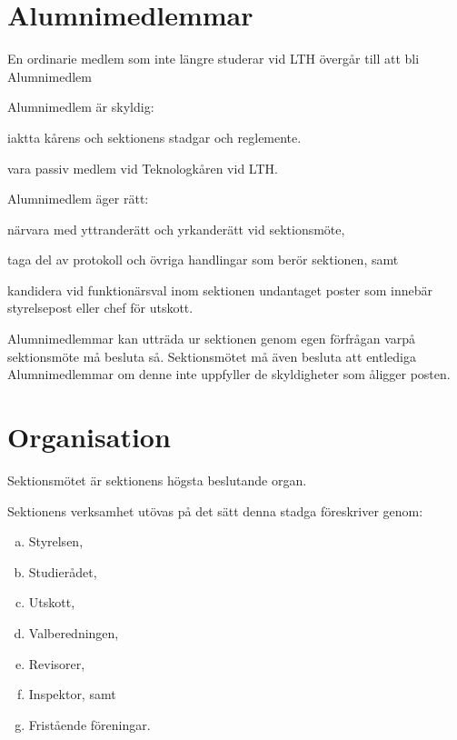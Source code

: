 \documentclass[stadgar]{dsekprotokoll}
\begin{document}
\section{Alumnimedlemmar}

\begin{stadgeavsnitt}

	En ordinarie medlem som inte längre
	studerar vid LTH övergår till att bli Alumnimedlem


Alumnimedlem är skyldig:
\begin{attlista}
	\item iaktta kårens och sektionens stadgar och reglemente.
	\item vara passiv medlem vid Teknologkåren vid LTH.
\end{attlista}


Alumnimedlem äger rätt:
\begin{attlista}
\item närvara med yttranderätt och yrkanderätt vid sektionsmöte,
\item taga del av protokoll och övriga handlingar som berör sektionen, samt
\item kandidera vid funktionärsval inom sektionen undantaget poster som
  innebär styrelsepost eller chef för utskott.
\end{attlista}

 Alumnimedlemmar kan utträda ur sektionen genom egen förfrågan varpå sektionsmöte må besluta så. Sektionsmötet må även besluta att entlediga Alumnimedlemmar om denne inte uppfyller de skyldigheter som åligger posten.

\end{stadgeavsnitt}

\section{Organisation}

\begin{stadgeavsnitt}


Sektionsmötet är sektionens högsta beslutande organ.


Sektionens verksamhet utövas på det sätt denna stadga föreskriver genom:
\begin{enumerate}[a)]
\item Styrelsen,
\item Studierådet,
\item Utskott,
\item Valberedningen,
\item Revisorer,
\item Inspektor, samt
\item Fristående föreningar.
\end{enumerate}

\end{stadgeavsnitt}
\end{document}
